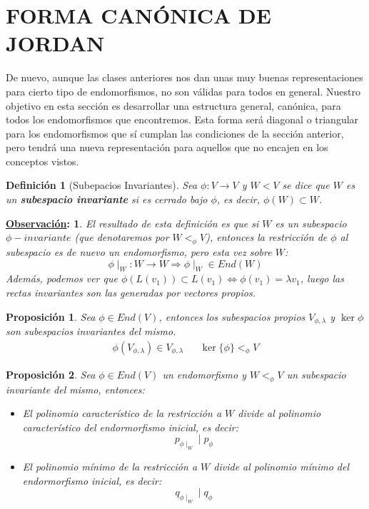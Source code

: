 \documentclass[10pt,a4paper,openright]{book}
\theoremstyle{break}
\newtheorem*{defi}{Definición}
\newtheorem*{prop}{Proposición}
\newtheorem*{obs}{\underline{Observación}:}
\begin{document}
\section{FORMA CANÓNICA DE JORDAN}
De nuevo, aunque las clases anteriores nos dan unas muy buenas representaciones para cierto tipo de endomorfismos, no son válidas para todos en general. Nuestro objetivo en esta sección es desarrollar una estructura general, canónica, para todos los endomorfismos que encontremos. Esta forma será diagonal o triangular para los endomorfismos que sí cumplan las condiciones de la sección anterior, pero tendrá una nueva representación para aquellos que no encajen en los conceptos vistos.

\begin{defi}[Subepacios Invariantes]
Sea $\phi: V\rightarrow V$ y $W<V$ se dice que $W$ es un \textbf{subespacio invariante} si es cerrado bajo $\phi$, es decir, $\phi(W)\subset W$.
\end{defi}

\begin{obs}
El resultado de esta definición es que si $W$ es un subespacio $\phi-invariante$ (que denotaremos por $W<_\phi V$), entonces la restricción de $\phi$ al subespacio es de nuevo un endomorfismo, pero esta vez sobre $W$:
$$\phi\mid_W: W\rightarrow W\Rightarrow \phi\mid_W\in End(W)$$
Además, podemos ver que $\phi(L(v_1))\subset L(v_1)\Leftrightarrow \phi(v_1)=\lambda v_1$, luego las rectas invariantes son las generadas por vectores propios.
\end{obs}

\begin{prop}
Sea $\phi\in End(V)$, entonces los subespacios propios $V_{\phi, \lambda}$ y $\ker \phi$ son subespacios invariantes del mismo.
\begin{align*}
\phi\left(V_{\phi,\lambda}\right)\in V_{\phi,\lambda} & & \ker\{\phi\}<_\phi V
\end{align*}
\end{prop}

\begin{prop}
Sea $\phi\in End(V)$ un endomorfismo y $W<_\phi V$ un subespacio invariante del mismo, entonces:
\begin{itemize}
\item El polinomio característico de la restricción a $W$ divide al polinomio característico del endormorfismo inicial, es decir:
$$p_{\phi\mid_W}\mid p_\phi$$

\item El polinomio mínimo de la restricción a $W$ divide al polinomio mínimo del endormorfismo inicial, es decir:
$$q_{\phi\mid_W}\mid q_\phi$$
\end{itemize}
\end{prop}
\end{document}
